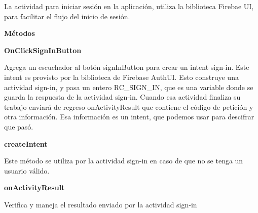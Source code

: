 \begin{fulllineitems}
\label{\detokenize{dev_docs:com.lar.cloudnao.SignInActivity}}
La actividad para iniciar sesión en la aplicación, utiliza la biblioteca Firebae UI, para facilitar el flujo del inicio de sesión.

\end{fulllineitems}



\textbf{Métodos}
\label{\detokenize{dev_docs:methods}}

\textbf{OnClickSignInButton}
\label{\detokenize{dev_docs:onclicksigninbutton}}

\begin{fulllineitems}
\label{\detokenize{dev_docs:com.lar.cloudnao.SignInActivity.OnClickSignInButton()}}
Agrega un escuchador al botón signInButton para crear un intent sign-in. Este intent es provisto por la biblioteca de Firebase AuthUI. Esto construye una actividad sign-in, y pasa un entero RC\_SIGN\_IN, que es una variable donde se guarda la respuesta de la actividad sign-in. Cuando esa actividad finaliza su trabajo enviará de regreso onActivityResult que contiene el código de petición y otra información. Esa información es un intent, que podemos usar para descifrar que pasó.

\end{fulllineitems}



\textbf{createIntent}
\label{\detokenize{dev_docs:createintent}}

\begin{fulllineitems}
\label{\detokenize{dev_docs:com.lar.cloudnao.SignInActivity.createIntent(Context)}}
Este método se utiliza por la actividad sign-in en caso de que no se tenga un usuario válido.

\end{fulllineitems}



\textbf{onActivityResult}
\label{\detokenize{dev_docs:onactivityresult}}

\begin{fulllineitems}
\label{\detokenize{dev_docs:com.lar.cloudnao.SignInActivity.onActivityResult(int, int, Intent)}}
Verifica y maneja el resultado enviado por la actividad sign-in

\end{fulllineitems}



